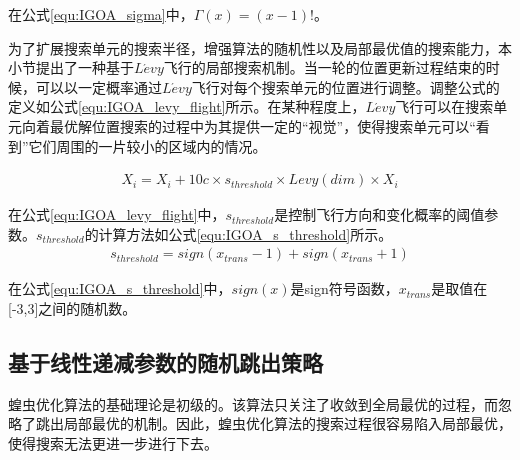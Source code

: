 在公式\ref{equ:IGOA_sigma}中，$\Gamma(x)=(x-1)!$。

为了扩展搜索单元的搜索半径，增强算法的随机性以及局部最优值的搜索能力，本小节提出了一种基于$L\acute{e}vy$飞行的局部搜索机制。当一轮的位置更新过程结束的时候，可以以一定概率通过$L\acute{e}vy$飞行对每个搜索单元的位置进行调整。调整公式的定义如公式\ref{equ:IGOA_levy_flight}所示。在某种程度上，$L\acute{e}vy$飞行可以在搜索单元向着最优解位置搜索的过程中为其提供一定的“视觉”，使得搜索单元可以“看到”它们周围的一片较小的区域内的情况。

\begin{eqnarray}\label{equ:IGOA_levy_flight}
	X_i=X_i+10c\times s_{threshold}\times Levy(dim)\times X_i
\end{eqnarray}

在公式\ref{equ:IGOA_levy_flight}中，$s_{threshold}$是控制飞行方向和变化概率的阈值参数。$s_{threshold}$的计算方法如公式\ref{equ:IGOA_s_threshold}所示。
\begin{eqnarray}\label{equ:IGOA_s_threshold}
	s_{threshold}=sign(x_{trans}-1)+sign(x_{trans}+1)
\end{eqnarray}

在公式\ref{equ:IGOA_s_threshold}中，$sign(x)$是sign符号函数，$x_{trans}$是取值在[-3,3]之间的随机数。
\subsection{基于线性递减参数的随机跳出策略}

蝗虫优化算法的基础理论是初级的。该算法只关注了收敛到全局最优的过程，而忽略了跳出局部最优的机制。因此，蝗虫优化算法的搜索过程很容易陷入局部最优，使得搜索无法更进一步进行下去。


